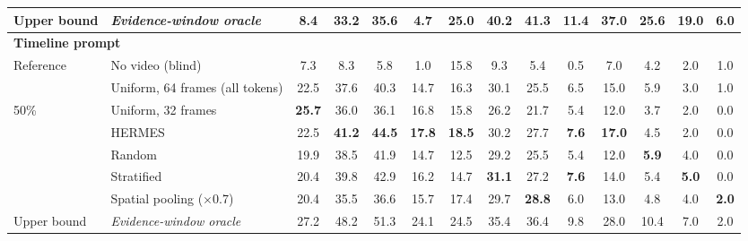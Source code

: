 \begin{table}[t]
\begin{tabular}{llcccccccccccc}
\cmidrule(lr){1-14}
Upper bound & \textit{Evidence-window oracle} & 8.4 & 33.2 & 35.6 & 4.7 & 25.0 & 40.2 & 41.3 & 11.4 & 37.0 & 25.6 & 19.0 & 6.0 \\
\midrule
\multicolumn{14}{l}{\textbf{Timeline prompt}} \\
\multirow{2}{*}{Reference} & No video (blind) & 7.3 & 8.3 & 5.8 & 1.0 & 15.8 & 9.3 & 5.4 & 0.5 & 7.0 & 4.2 & 2.0 & 1.0 \\
 & Uniform, 64 frames (all tokens) & 22.5 & 37.6 & 40.3 & 14.7 & 16.3 & 30.1 & 25.5 & 6.5 & 15.0 & 5.9 & 3.0 & 1.0 \\
\cmidrule(lr){1-14}
\multirow{5}{*}{50\%} & Uniform, 32 frames & \textbf{25.7} & 36.0 & 36.1 & 16.8 & 15.8 & 26.2 & 21.7 & 5.4 & 12.0 & 3.7 & 2.0 & 0.0 \\
 & HERMES & 22.5 & \textbf{41.2} & \textbf{44.5} & \textbf{17.8} & \textbf{18.5} & 30.2 & 27.7 & \textbf{7.6} & \textbf{17.0} & 4.5 & 2.0 & 0.0 \\
 & Random & 19.9 & 38.5 & 41.9 & 14.7 & 12.5 & 29.2 & 25.5 & 5.4 & 12.0 & \textbf{5.9} & 4.0 & 0.0 \\
 & Stratified & 20.4 & 39.8 & 42.9 & 16.2 & 14.7 & \textbf{31.1} & 27.2 & \textbf{7.6} & 14.0 & 5.4 & \textbf{5.0} & 0.0 \\
 & Spatial pooling ($\times$0.7) & 20.4 & 35.5 & 36.6 & 15.7 & 17.4 & 29.7 & \textbf{28.8} & 6.0 & 13.0 & 4.8 & 4.0 & \textbf{2.0} \\
\cmidrule(lr){1-14}
Upper bound & \textit{Evidence-window oracle} & 27.2 & 48.2 & 51.3 & 24.1 & 24.5 & 35.4 & 36.4 & 9.8 & 28.0 & 10.4 & 7.0 & 2.0 \\
\bottomrule
\end{tabular}
\end{table}

